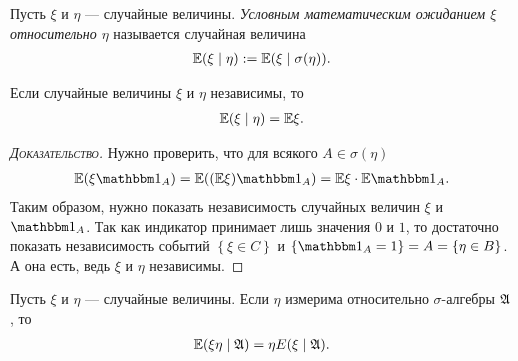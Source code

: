 \documentclass[../main.tex]{subfiles}
\begin{document}
\begin{df}
 Пусть $ \xi $ и $ \eta $ --- случайные величины. \textit{Условным математическим ожиданием $ \xi $ относительно $ \eta $} называется случайная величина
 \begin{align*}
  \mathbb E(\xi \mid \eta) := \mathbb E (\xi \mid \sigma(\eta)).
 \end{align*} 
\end{df}
\begin{thm}
 Если случайные величины $ \xi $ и $ \eta $ независимы, то
 \begin{align*}
  \mathbb E(\xi \mid \eta) = \mathbb E\xi.
 \end{align*}
\end{thm}
\begin{proof}[\normalfont\textsc{Доказательство}]
 Нужно проверить, что для всякого $ A \in \sigma(\eta) $
   \begin{align*}
    \E(\xi\Ind_A) = \E((\E\xi)\Ind_A) = \E\xi \cdot \E \Ind_A.
   \end{align*} Таким образом, нужно показать независимость случайных величин $ \xi $  и $ \Ind_A $. Так как индикатор принимает лишь значения $ 0 $ и $ 1 $, то достаточно показать независимость событий $ \left\{ \xi \in C \right\} $ и $ \left\{ \Ind_A = 1 \right\} = A  = \left\{ \eta \in B \right\}$. А она есть, ведь $ \xi $ и $ \eta $ независимы.
\end{proof}
\begin{thm}
 Пусть $ \xi $ и $ \eta $ --- случайные величины. Если $ \eta $ измерима относительно $ \sigma $-алгебры $ \mathfrak A $, то
  \begin{align*}
   \mathbb E(\xi\eta \mid\mathfrak A) = \eta E(\xi \mid \mathfrak A).
  \end{align*}
\end{thm}
\end{document}
